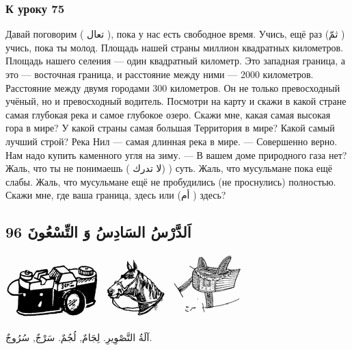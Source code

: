 \documentclass[a5paper]{article}
\begin{document}
\subsubsection[К уроку 75]{К уроку 75}
Давай поговорим ( تعال ), пока у нас есть свободное время. Учись, ещё раз (ثمّ ) учись, пока ты молод. Площадь нашей страны миллион квадратных километров. Площадь нашего селения — один квадратный километр. Это западная граница, а это — восточная граница, и расстояние между ними — 2000 километров. Расстояние между двумя городами 300 километров. Он не только превосходный учёный, но и превосходный водитель. Посмотри на карту и скажи в какой стране самая глубокая река и самое глубокое озеро. Скажи мне, какая самая высокая гора в мире? У какой страны самая большая Территория в мире? Какой самый лучший строй? Река Нил — самая длинная река в мире. — Совершенно верно. Нам надо купить каменного угля на зиму. — В вашем доме природного газа нет? Жаль, что ты не понимаешь ( لا تدرك) ) суть. Жаль, что мусульмане пока ещё слабы. Жаль, что мусульмане ещё не пробудились (не проснулись) полностью. Скажи мне, где ваша граница, здесь или (أم ) здесь?

\subsection{اَلدَّرْسُ السَادِسُ وَ التِّسْعُونَ 96}
 \includegraphics[width=1.4272in,height=0.8646in]{images/MuhammadBagauddinprettified-img269.png}   \includegraphics[width=0.9791in,height=0.8957in]{images/MuhammadBagauddinprettified-img270.png}   \includegraphics[width=1.1252in,height=0.9689in]{images/MuhammadBagauddinprettified-img271.png} 

آلَةُ التَّصْوِيرِ. لِجَامٌ, لُجُمٌ. سَرْجٌ, سُرُوجٌ.
\end{document}
